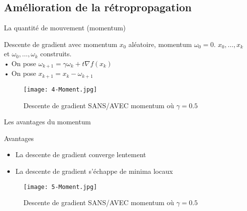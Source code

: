 \subsection{Amélioration de la rétropropagation}



\begin{frame}{La quantité de mouvement (momentum)}
    \begin{block}{Descente de gradient avec momentum}
        $x_0$ aléatoire, momentum $\omega_0 = 0$.
        $x_0, \ldots, x_k$ et $\omega_0, \ldots, \omega_k$ construits. \\
        • On pose $\omega_{k+1} = \gamma \omega_k + t \nabla f(x_k)$ \\
        • On pose $x_{k+1} = x_k - \omega_{k+1}$
    \end{block}
    \begin{figure}
        \centering
        \texttt{[image: 4-Moment.jpg]}
        \caption{Descente de gradient SANS/AVEC momentum où $\gamma = 0.5$}
    \end{figure}
\end{frame}



\begin{frame}{Les avantages du momentum}
    \begin{exampleblock}{Avantages}
        \begin{itemize}
            \item La descente de gradient converge lentement
            \item La descente de gradient s'échappe de minima locaux  
        \end{itemize}  
    \end{exampleblock}
    \begin{figure}
        \centering
        \texttt{[image: 5-Moment.jpg]}
        \caption{Descente de gradient SANS/AVEC momentum où $\gamma = 0.5$}
    \end{figure}
\end{frame}




